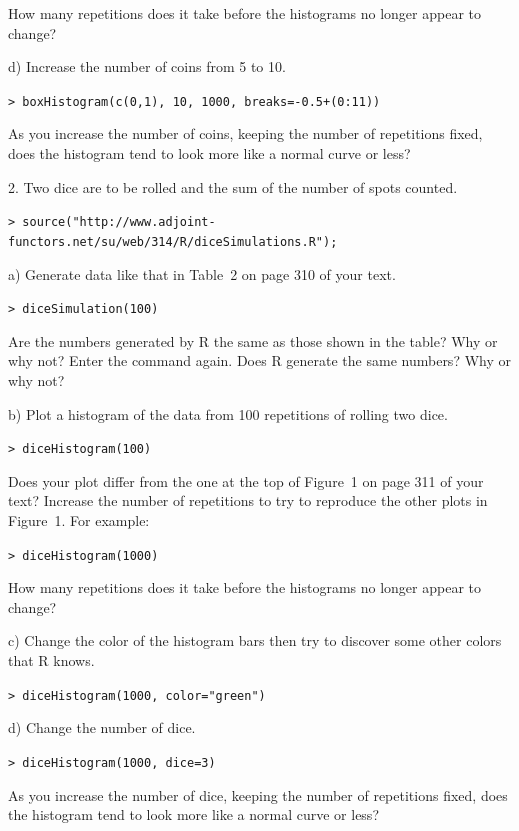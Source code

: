 \documentclass[10pt]{article}
\begin{document}
How many repetitions does it take before the histograms no longer appear to change?

\hspace{20pt} d) Increase the number of coins from 5 to 10.

\HH \lstinline!> boxHistogram(c(0,1), 10, 1000, breaks=-0.5+(0:11))!

As you increase the number of coins, keeping the number of repetitions fixed, does the 
histogram tend to look more like a normal curve or less?
\vspace{.5in}

2. Two dice are to be rolled and the sum of the number of spots counted.  

\HH \lstinline!> source("http://www.adjoint-functors.net/su/web/314/R/diceSimulations.R");!

\hspace{20pt} a) Generate data like that in Table~2 on page 310 of your text.  

\HH \lstinline!> diceSimulation(100)!

Are the numbers generated by R the same as those shown in the table?  Why or why not?
Enter the command again.  Does R generate the same numbers? Why or why not?

\hspace{20pt} b) Plot a histogram of the data from 100 repetitions of rolling two dice.

\HH \lstinline!> diceHistogram(100)!

Does your plot differ from the one at the top of Figure~1 on page 311 of your text?  Increase the
number of repetitions to try to reproduce the other plots in Figure~1.  For example:

\HH \lstinline!> diceHistogram(1000)!

How many repetitions does it take before the histograms no longer appear to change?

\hspace{20pt} c) Change the color of the histogram bars then try to discover some other colors that R knows.

\HH \lstinline!> diceHistogram(1000, color="green")!

\hspace{20pt} d) Change the number of dice.

\HH \lstinline!> diceHistogram(1000, dice=3)!

As you increase the number of dice, keeping the number of repetitions fixed, does the histogram tend to
look more like a normal curve or less?
\end{document}
